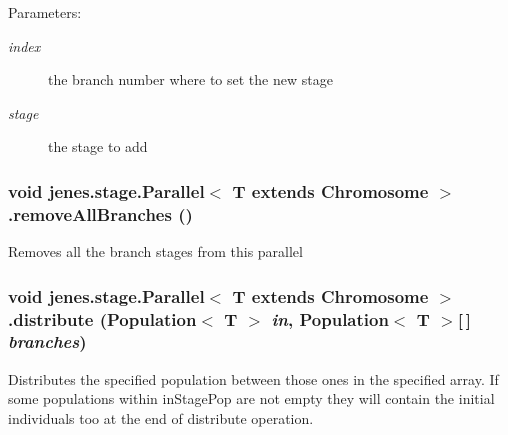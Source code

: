 \begin{Desc}
\item[Parameters:]
\begin{description}
\item[{\em index}]the branch number where to set the new stage \item[{\em stage}]the stage to add \end{description}
\end{Desc}
\hypertarget{classjenes_1_1stage_1_1_parallel_3_01_t_01extends_01_chromosome_01_4_cc2efb924520eb73061928e39580202c}{
\subsubsection[removeAllBranches]{\setlength{\rightskip}{0pt plus 5cm}void jenes.stage.Parallel$<$ T extends Chromosome $>$.removeAllBranches ()}}
\label{classjenes_1_1stage_1_1_parallel_3_01_t_01extends_01_chromosome_01_4_cc2efb924520eb73061928e39580202c}


Removes all the branch stages from this parallel \hypertarget{classjenes_1_1stage_1_1_parallel_3_01_t_01extends_01_chromosome_01_4_afb82610de353045546319738543fab9}{
\subsubsection[distribute]{\setlength{\rightskip}{0pt plus 5cm}void jenes.stage.Parallel$<$ T extends Chromosome $>$.distribute (Population$<$ T $>$ {\em in}, \/  Population$<$ T $>$\mbox{[}$\,$\mbox{]} {\em branches})}}
\label{classjenes_1_1stage_1_1_parallel_3_01_t_01extends_01_chromosome_01_4_afb82610de353045546319738543fab9}


Distributes the specified population between those ones in the specified array. If some populations within inStagePop are not empty they will contain the initial individuals too at the end of distribute operation. 

